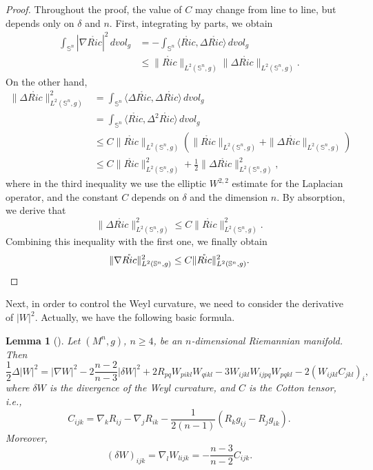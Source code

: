 \documentclass[a4, 12pt]{amsart}
\theoremstyle{plain}
\newtheorem{lem}[theo]{Lemma}
\begin{document}
\begin{proof}
	Throughout the proof, the value of $C$ may change from line to line, but depends only on $\delta$ and $n$. First, integrating by parts, we obtain
	\begin{align*}
		\int_{\mathbb{S}^n} |\nabla \mathring{Ric}|^2 \, dvol_g
		&= -\int_{\mathbb{S}^n} \langle \mathring{Ric}, \Delta \mathring{Ric} \rangle \, dvol_g \\
		&\leq \|\mathring{Ric}\|_{L^2(\mathbb{S}^n, g)} \|\Delta \mathring{Ric}\|_{L^2(\mathbb{S}^n, g)}.
	\end{align*}
	On the other hand,
	\begin{align*}
		\|\Delta \mathring{Ric}\|_{L^2(\mathbb{S}^n, g)}^2
		&= \int_{\mathbb{S}^n} \langle \Delta \mathring{Ric}, \Delta \mathring{Ric} \rangle \, dvol_g \\
		&= \int_{\mathbb{S}^n} \langle \mathring{Ric}, \Delta^2 \mathring{Ric} \rangle \, dvol_g \\
		&\leq C \|\mathring{Ric}\|_{L^2(\mathbb{S}^n, g)} \left(\|\mathring{Ric}\|_{L^2(\mathbb{S}^n, g)} + \|\Delta \mathring{Ric}\|_{L^2(\mathbb{S}^n, g)}\right) \\
		&\leq C \|\mathring{Ric}\|_{L^2(\mathbb{S}^n, g)}^2 + \frac{1}{2} \|\Delta \mathring{Ric}\|_{L^2(\mathbb{S}^n, g)}^2,
	\end{align*}
	where in the third inequality we use the elliptic $W^{2,2}$ estimate for the Laplacian operator, and the constant $C$ depends on $\delta$ and the dimension $n$. By absorption, we derive that
	\[
	\|\Delta \mathring{Ric}\|_{L^2(\mathbb{S}^n, g)}^2 \leq C \|\mathring{Ric}\|_{L^2(\mathbb{S}^n, g)}^2.
	\]
	Combining this inequality with the first one, we finally obtain
	\[
	\|\nabla \mathring{Ric}\|_{L^2(\mathbb{S}^n, g)}^2 \leq C \|\mathring{Ric}\|_{L^2(\mathbb{S}^n, g)}^2. \qedhere
	\]
\end{proof}

Next, in order to control the Weyl curvature, we need to consider the derivative of $|W|^2$. Actually,  we have the following basic formula.

\begin{lem}[\cite{Catino}]\label{lem:catino-estimate}
	Let $(M^n, g)$, $n \geq 4$, be an $n$-dimensional Riemannian manifold. Then
	\[
	\frac{1}{2}\Delta |W|^2 = |\nabla W|^2 - 2\frac{n-2}{n-3}|\delta W|^2 + 2R_{pq}W_{pikl}W_{qikl} - 3W_{ijkl}W_{ijpq}W_{pqkl} - 2(W_{ijkl}C_{jkl})_i,
	\]
	where $\delta W$ is the divergence of the Weyl curvature, and $C$ is the Cotton tensor, i.e.,
	\[
	C_{ijk} = \nabla_k R_{ij} - \nabla_j R_{ik} - \frac{1}{2(n-1)}(R_k g_{ij} - R_j g_{ik}).
	\]
	Moreover,
	\[
	(\delta W)_{ijk} = \nabla_l W_{lijk} = -\frac{n-3}{n-2}C_{ijk}.
	\]
\end{lem}
\end{document}
